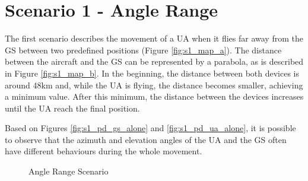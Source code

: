 \section{Scenario 1 - Angle Range}\label{sec:scenario1}
The first scenario describes the movement of a UA when it flies far away from the GS between two predefined positions (Figure \ref{fig:s1_map_a}). The distance between the aircraft and the GS can be represented by a parabola, as is described in Figure \ref{fig:s1_map_b}. In the beginning, the distance between both devices is around 48km and, while the UA is flying, the distance becomes smaller, achieving a minimum value. After this minimum, the distance between the devices increases until the UA reach the final position.

Based on Figures \ref{fig:s1_pd_gs_alone} and \ref{fig:s1_pd_ua_alone}, it is possible to observe that the azimuth and elevation angles of the UA and the GS often have different behaviours during the whole movement. 
  

\begin{figure}[H]
	\hfill
	\hfill
	\hfill
	\caption{Angle Range Scenario}
	\label{fig:s1_map}
\end{figure}

